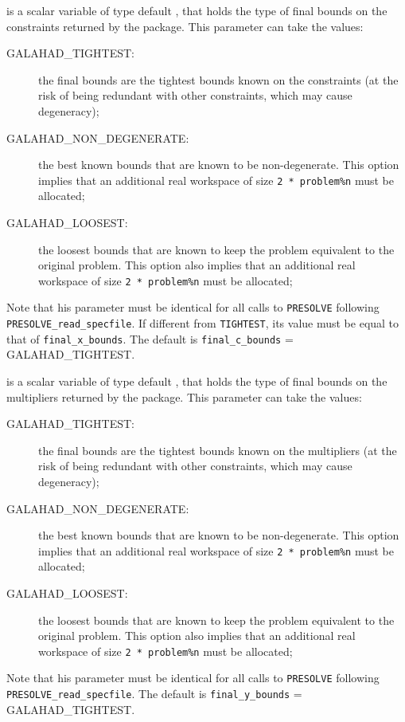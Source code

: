 \documentclass{galahad}
\newcommand{\packagename}{PRESOLVE}
\newcommand{\sym}{\sf\small}
\begin{document}
\begin{description}
 is a scalar variable of type default \integer, that
holds the type of final bounds on the constraints returned by 
the package.  This parameter can take the values:
\begin{description}
\item[\sym GALAHAD\_TIGHTEST:] the final bounds are the tightest bounds
                known on the constraints (at the risk of
                being redundant with other constraints,
                which may cause degeneracy);
\item[\sym GALAHAD\_NON\_DEGENERATE:] the best known bounds that are known to
                      be non-degenerate. This option implies
                      that an additional real workspace of size
                      {\tt 2 * problem\%n} must be allocated;
\item[\sym GALAHAD\_LOOSEST:] the loosest bounds that are known to
               keep the problem equivalent to the
               original problem. This option also 
               implies that an additional real workspace of size
               {\tt 2 * problem\%n} must be allocated;
\end{description}
Note that his parameter must be identical for all calls to 
{\tt \packagename} following {\tt \packagename\_read\_specfile}. If different from
{\tt TIGHTEST}, its value must be equal to that of {\tt final\_x\_bounds}.
The default is {\tt final\_c\_bounds} = {\sym GALAHAD\_TIGHTEST}.
         
 is a scalar variable of type default \integer, that
holds the type of final bounds on the multipliers returned by 
the package.  This parameter can take the values:
\begin{description}
\item[\sym GALAHAD\_TIGHTEST:] the final bounds are the tightest bounds
                known on the multipliers (at the risk of
                being redundant with other constraints,
                which may cause degeneracy);
\item[\sym GALAHAD\_NON\_DEGENERATE:] the best known bounds that are known to
                      be non-degenerate. This option implies
                      that an additional real workspace of size
                      {\tt 2 * problem\%n} must be allocated;
\item[\sym GALAHAD\_LOOSEST:] the loosest bounds that are known to
               keep the problem equivalent to the
               original problem. This option also 
               implies that an additional real workspace of size
               {\tt 2 * problem\%n} must be allocated;
\end{description}
Note that his parameter must be identical for all calls to 
{\tt \packagename} following {\tt \packagename\_read\_specfile}.
The default is {\tt final\_y\_bounds} = {\sym GALAHAD\_TIGHTEST}.
         

\end{description}
\end{document}
